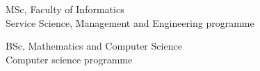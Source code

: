 \documentclass[12pt, a4paper]{article}
\begin{document}
\begin{minipage}[t]{0.6\textwidth}
    
    \begin{sectionBody}
        \> MSc, Faculty of Informatics \\
        \> Service Science, Management and Engineering programme \\
    \end{sectionBody}
    
    \begin{sectionBody}
        \> BSc, Mathematics and Computer Science \\
        \> Computer science programme \\
    \end{sectionBody}
\end{minipage}
\end{document}
